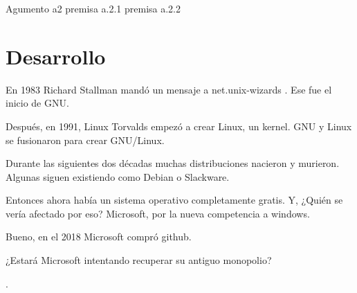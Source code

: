 \documentclass[12pt, twoside]{article}
\begin{document}
Agumento a2
premisa a.2.1
premisa a.2.2

\section{Desarrollo}%
\label{sec:Desarrollo}
En 1983 Richard Stallman mandó un mensaje a net.unix-wizards \citet[89]{faif}.
Ese fue el inicio de GNU.

Después, en 1991, Linux Torvalds empezó a crear Linux, un kernel.
GNU y Linux se fusionaron para crear GNU/Linux.

Durante las siguientes dos décadas muchas distribuciones nacieron y murieron.
Algunas siguen existiendo como Debian o Slackware. \citet{DISTROS}

Entonces ahora había un sistema operativo completamente gratis.
Y, ¿Quién se vería afectado por eso?
Microsoft, por la nueva competencia a windows. \citet{HALLO1}

Bueno, en el 2018 Microsoft compró github. \citet{GITHUB}

¿Estará Microsoft intentando recuperar su antiguo monopolio?

\newpage
.
\vfill
\nocite{*}
\printbibliography
\end{document}
